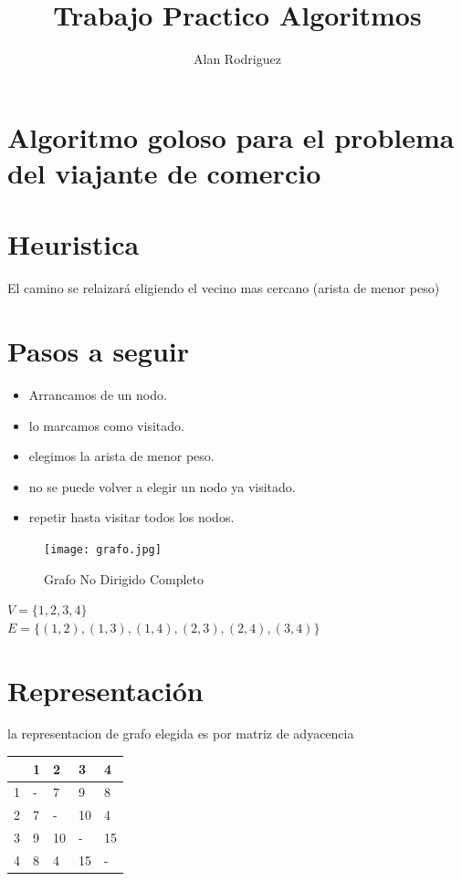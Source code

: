 \documentclass[a4paper,11pt]{article}
\title{Trabajo Practico Algoritmos}
\author{Alan Rodriguez}
\begin{document}
\maketitle
\tableofcontents


\begin{abstract}
\end{abstract}

\section{Algoritmo goloso para el problema del viajante de comercio}

\section*{Heuristica}
El camino se relaizará eligiendo el vecino mas cercano (arista de menor peso)

\section*{Pasos a seguir}
\begin{itemize}
  \item Arrancamos de un nodo.
  \item lo marcamos como visitado.
  \item elegimos la arista de menor peso.
  \item no se puede volver a elegir un nodo ya visitado.
  \item repetir hasta visitar todos los nodos.
\end{itemize}
\begin{figure}
  \begin{center}
    \texttt{[image: grafo.jpg]}
    \caption{Grafo No Dirigido Completo}
    \label{fig:}
  \end{center}
\end{figure}

\begin{description}
  \item [$V = \{ 1,2,3,4\} $]
  \item [$E = \{ (1,2),(1,3),(1,4),(2,3),(2,4),(3,4)\} $]
\end{description}
 
\section*{Representación} la representacion de grafo elegida es por matriz de adyacencia
\begin{table}[htbp]
\centering
\begin{tabular}{|l|l|l|l|l|}
\hline
&1 & 2 & 3 & 4  \\
\hline
1&-&7&9&8 \\
\hline
2&7&-&10&4 \\
\hline
3&9&10&-&15 \\
\hline
4&8&4&15&- \\
\hline
\end{tabular}
\end{table}
\end{document}
